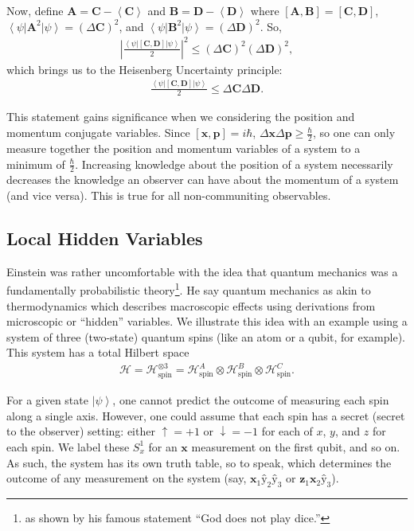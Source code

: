 \documentclass[11pt]{article} %
\newcommand{\bra}[1]{\left\langle #1 \right|}
\newcommand{\ket}[1]{\left|#1\right\rangle}
\begin{document}
Now, define $\textbf{A} = \textbf{C} - \left<\textbf{C}\right>$ and $\textbf{B} = \textbf{D} - \left<\textbf{D}\right>$ where $\left[\textbf{A},\textbf{B}\right] = \left[\textbf{C},\textbf{D}\right]$, $\bra{\psi}\textbf{A}^2\ket{\psi} = \left(\Delta\textbf{C}\right)^2$, and $\bra{\psi}\textbf{B}^2\ket{\psi} = \left(\Delta\textbf{D}\right)^2$. So,
\begin{align}
    \left|\frac{\bra{\psi}\left[\textbf{C},\textbf{D}\right]\ket{\psi}}{2}\right|^2 \leq \left(\Delta\textbf{C}\right)^2\left(\Delta\textbf{D}\right)^2,
\end{align}
which brings us to the Heisenberg Uncertainty principle:
\begin{align}
    \frac{\bra{\psi}\left[\textbf{C},\textbf{D}\right]\ket{\psi}}{2} \leq \Delta\textbf{C}\Delta\textbf{D}.
\end{align}

This statement gains significance when we considering the position and momentum conjugate variables. Since $\left[\textbf{\^x},\textbf{\^p}\right] = i\hbar$, $\Delta\textbf{\^x}\Delta\textbf{\^p} \geq \frac{\hbar}{2}$, so one can only measure together the position and momentum variables of a system to a minimum of $\frac{\hbar}{2}$. Increasing knowledge about the position of a system necessarily decreases the knowledge an observer can have about the momentum of a system (and vice versa). This is true for all non-communiting observables.

\subsection{Local Hidden Variables}

Einstein was rather uncomfortable with the idea that quantum mechanics was a fundamentally probabilistic theory\footnote{as shown by his famous statement ``God does not play dice.''}. He say quantum mechanics as akin to thermodynamics which describes macroscopic effects using derivations from microscopic or ``hidden'' variables. We illustrate this idea with an example using a system of three (two-state) quantum spins (like an atom or a qubit, for example). This system has a total Hilbert space
\begin{align}
\mathcal{H} = \mathcal{H}^{\otimes3}_\textrm{spin} = \mathcal{H}^A_\textrm{spin}\otimes\mathcal{H}^B_\textrm{spin}\otimes\mathcal{H}^C_\textrm{spin}.
\end{align}

For a given state $\ket{\psi}$, one cannot predict the outcome of measuring each spin along a single axis. However, one could assume that each spin has a secret (secret to the observer) setting: either $\uparrow = +1$ or $\downarrow = -1$ for each of $x$, $y$, and $z$ for each spin. We label these $S^1_x$ for an $\textbf{\^x}$ measurement on the first qubit, and so on. As such, the system has its own truth table, so to speak, which determines the outcome of any measurement on the system (say, $\textbf{\^x}_1\textbf{\^y}_2\textbf{\^y}_3$ or $\textbf{\^z}_1\textbf{\^x}_2\textbf{\^y}_3$).
\end{document}
